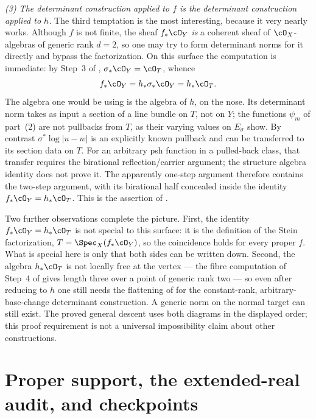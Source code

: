 \begin{example}
\emph{(3) The determinant construction applied to $f$ is the determinant
construction applied to $h$.}
The third temptation is the most interesting, because it very nearly works.
Although $f$ is not finite, the sheaf $f_*\cO_Y$ \emph{is} a coherent
sheaf of $\cO_X$-algebras of generic rank $d=2$, so one may try to form
determinant norms for it directly and bypass the factorization.  On this
surface the computation is immediate: by Step~3 of
, $\sigma_*\cO_Y=\cO_T$, whence
\[
 f_*\cO_Y=h_*\sigma_*\cO_Y=h_*\cO_T .
\]
The algebra one would be using is the algebra of $h$, on the nose.  Its
determinant norm takes as input a section of a line bundle on $T$, not on
$Y$; the functions $\psi_m$ of part~(2) are not pullbacks from $T$,
as their varying values on $E_\sigma$ show.
By contrast $\sigma^*\log|u-w|$ is an explicitly known pullback
and can be transferred to its section data on $T$.
For an arbitrary psh function in a pulled-back class, that transfer
requires the birational reflection/carrier argument; the structure
algebra identity does not prove it.  The apparently one-step
argument therefore contains the two-step argument, with its birational half
concealed inside the identity $f_*\cO_Y=h_*\cO_T$.  This is the assertion
of .

Two further observations complete the picture.  First, the identity
$f_*\cO_Y=h_*\cO_T$ is not special to this surface: it is the definition of
the Stein factorization, $T=\Spec_X(f_*\cO_Y)$, so the coincidence holds
for every proper $f$.  What is special here is only that both sides can be
written down.  Second, the algebra $h_*\cO_T$ is not locally free at the
vertex --- the fibre computation of Step~4 of  gives
length three over a point of generic rank two --- so even after reducing to
$h$ one still needs the flattening of 
for the constant-rank, arbitrary-base-change determinant construction.
A generic norm on the normal target can still exist.
The proved general descent uses both diagrams in the displayed order;
this proof requirement is not a universal impossibility claim
about other constructions.
\end{example}

\section{Proper support, the extended-real audit, and checkpoints}
\label{sec:ch42-audit}

